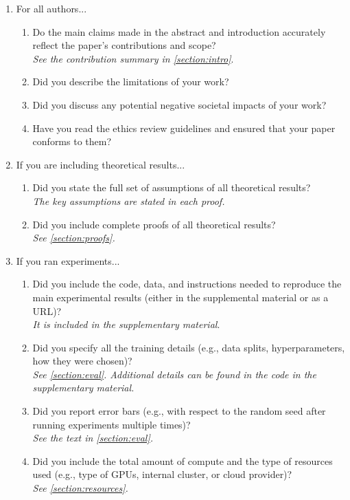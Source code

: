 \begin{enumerate}

\item For all authors...
\begin{enumerate}
\item Do the main claims made in the abstract and introduction accurately reflect the paper's contributions and scope?
  \answerYes{} \\
  \textit{See the contribution summary in \cref{section:intro}}.
\item Did you describe the limitations of your work?
  \answerTODO{}
\item Did you discuss any potential negative societal impacts of your work?
  \answerNo{}
\item Have you read the ethics review guidelines and ensured that your paper conforms to them?
  \answerYes{}
\end{enumerate}

\item If you are including theoretical results...
  \begin{enumerate}
  \item Did you state the full set of assumptions of all theoretical results?
    \answerYes{} \\
    \textit{The key assumptions are stated in each proof.}
  \item Did you include complete proofs of all theoretical results?
    \answerYes{} \\
    \textit{See \cref{section:proofs}.}
\end{enumerate}

\item If you ran experiments...
\begin{enumerate}
\item Did you include the code, data, and instructions needed to reproduce the main experimental results (either in the supplemental material or as a URL)?
  \answerYes{} \\
  \textit{It is included in the supplementary material}.
\item Did you specify all the training details (e.g., data splits, hyperparameters, how they were chosen)?
  \answerYes{} \\
  \textit{See \cref{section:eval}. Additional details can be found in the code in the supplementary material.}
\item Did you report error bars (e.g., with respect to the random seed after running experiments multiple times)?
  \answerYes{} \\
  \textit{See the text in \cref{section:eval}.}
\item Did you include the total amount of compute and the type of resources used (e.g., type of GPUs, internal cluster, or cloud provider)?
  \answerYes{} \\
  \textit{See \cref{section:resources}.}
\end{enumerate}



\end{enumerate}
